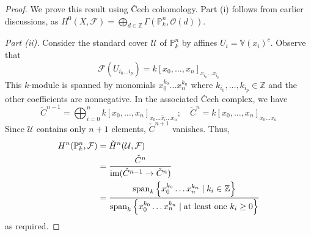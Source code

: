 \begin{proof}
	We prove this result using \v{C}ech cohomology.
	Part (i) follows from earlier discussions, as \( H^0(X, \mathcal F) = \bigoplus_{d \in \mathbb Z} \Gamma(\mathbb P^n_k, \mathcal O(d)) \).

	\emph{Part (ii).}
	Consider the standard cover \( \mathcal U \) of \( \mathbb P^n_k \) by affines \( U_i = \mathbb V(x_i)^c \).
	Observe that
	\[ \mathcal F(U_{i_0 \dots i_p}) = k[x_0, \dots, x_n]_{x_{i_0} \dots x_{i_p}} \]
	This \( k \)-module is spanned by monomials \( x_0^{k_0} \dots x_n^{k_n} \) where \( k_{i_0}, \dots, k_{i_p} \in \mathbb Z \) and the other coefficients are nonnegative.
	In the associated \v{C}ech complex, we have
	\[ \check{C}^{n-1} = \bigoplus_{i=0}^n k[x_0, \dots, x_n]_{x_0 \dots \hat x_i \dots x_n};\quad \check{C}^n = k[x_0, \dots, x_n]_{x_0 \dots x_n} \]
	Since \( \mathcal U \) contains only \( n + 1 \) elements, \( \check{C}^{n+1} \) vanishes.
	Thus,
	\begin{align*}
		H^n(\mathbb P^n_k, \mathcal F) &= \check{H}^n(\mathcal U, \mathcal F) \\
		&= \frac{\check{C}^n}{\operatorname{im} (\check{C}^{n-1} \to \check{C}^n)} \\
		&= \frac{\operatorname{span}_k \qty{x_0^{k_0} \dots x_n^{k_n} \mid k_i \in \mathbb Z}}{\operatorname{span}_k \qty{x_0^{k_0} \dots x_n^{k_n} \mid \text{at least one } k_i \geq 0}}
	\end{align*}
	as required.


\end{proof}
